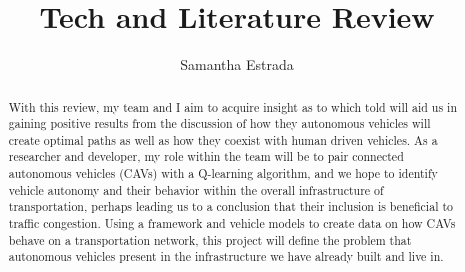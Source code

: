 \documentclass[letterpaper,10pt,draftclsnofoot,onecolumn]{IEEEtran} %
\begin{document}
\author{Samantha Estrada}
\title{Tech and Literature Review}
\maketitle

\begin{abstract}
    With this review, my team and I aim to acquire insight as to which told will aid us in gaining positive results from the
discussion of how they autonomous vehicles will create optimal paths as well as how they coexist with human driven
vehicles. As a researcher and developer, my role within the team will be to pair connected autonomous vehicles
(CAVs) with a Q-learning algorithm, and we hope to identify vehicle autonomy and their behavior within the overall
infrastructure of transportation, perhaps leading us to a conclusion that their inclusion is beneficial to traffic
congestion. Using a framework and vehicle models to create data on how CAVs behave on a transportation network,
this project will define the problem that autonomous vehicles present in the infrastructure we have already built and
live in.
\end{abstract}
\pagebreak
\end{document}
